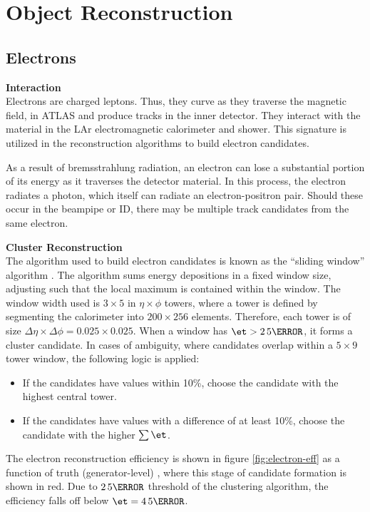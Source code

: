 \section{Object Reconstruction} \label{sec:reconstruction}
\subsection{Electrons}

\noindent\textbf{Interaction}\\
\indent Electrons are charged leptons. Thus, they curve as they traverse the magnetic field, in ATLAS and produce tracks in the inner detector. They interact with the material in the \gls{LAr} electromagnetic calorimeter and shower. This signature is utilized in the reconstruction algorithms to build electron candidates.

As a result of bremsstrahlung radiation, an electron can lose a substantial portion of its energy as it traverses the detector material. In this process, the electron radiates a photon, which itself can radiate an electron-positron pair. Should these occur in the beampipe or \gls{ID}, there may be multiple track candidates from the same electron.

\noindent\textbf{Cluster Reconstruction}\\
\indent The algorithm used to build electron candidates is known as the ``sliding window'' algorithm \cite{sliding-window}. The algorithm sums energy depositions in a fixed window size, adjusting such that the local \et maximum is contained within the window. The window width used is $3 \times 5$ in $\eta \times \phi$ towers, where a tower is defined by segmenting the calorimeter into $200 \times 256$ elements. Therefore, each tower is of size $\Delta \eta \times \Delta \phi = 0.025 \times 0.025$. When a window has $\et > \unit{2.5}{\GeV}$, it forms a cluster candidate. In cases of ambiguity, where candidates overlap within a $5 \times 9$ tower window, the following logic is applied:
\begin{itemize}
    \item If the candidates have \et values within 10\%, choose the candidate with the highest \et central tower.
    \item If the candidates have \et values with a difference of at least 10\%, choose the candidate with the higher $\sum \et$.
\end{itemize}


The electron reconstruction efficiency is shown in figure \ref{fig:electron-eff} as a function of truth (generator-level) \et, where this stage of candidate formation is shown in red. Due to $\unit{2.5}{\GeV}$ threshold of the clustering algorithm, the efficiency falls off below $\et = \unit{4.5}{\GeV}$.

